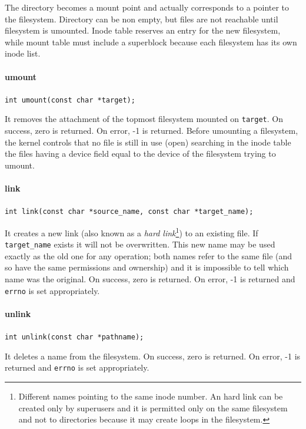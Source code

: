 The directory becomes a mount point and actually corresponds to a pointer to the filesystem. Directory can be non empty, but files are not reachable until filesystem is umounted. Inode table reserves an entry for the new filesystem, while mount table must include a superblock because each filesystem has its own inode list.

\paragraph{umount}
\texttt{int umount(const char *target);}

It removes the attachment of the topmost filesystem mounted on \texttt{target}.  On success, zero is
returned. On error, -1 is returned. Before umounting a filesystem, the kernel controls that no file is still in use (open) searching in the inode table the files having a device field equal to the device of the filesystem trying to umount.

\paragraph{link}
\texttt{int link(const char *source\_name, const char *target\_name);}

It creates a new link (also known as a \emph{hard link}\footnote{Different names pointing to the same inode number. An hard link can be created only by superusers and it is permitted only on the same filesystem and not to directories because it may create loops in the filesystem.}) to an existing file. If \texttt{target\_name} exists it will not be overwritten. This new name may be used exactly as the old one for any operation; both names refer to the same file (and so have the same permissions and ownership) and it is impossible to tell which name was the original. On success, zero is returned. On error, -1 is returned and \texttt{errno} is set appropriately.

\paragraph{unlink}
\texttt{int unlink(const char *pathname);}

It deletes a name from the filesystem. On success, zero is returned. On error, -1 is returned and \texttt{errno} is set appropriately.

